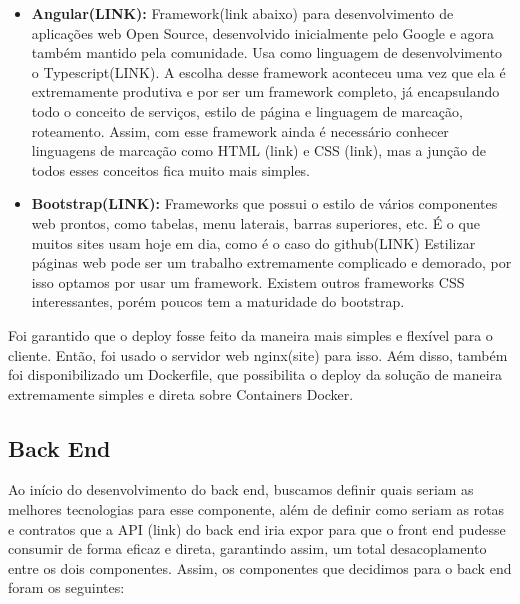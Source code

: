 \documentclass[11pt,twoside]{article}
\begin{document}
\begin{itemize}
  \item \textbf{Angular(LINK):} Framework(link abaixo) para desenvolvimento de aplicações web Open Source, desenvolvido inicialmente pelo Google e agora também mantido pela comunidade. Usa como linguagem de desenvolvimento o
  Typescript(LINK). A escolha desse framework aconteceu uma vez que ela é extremamente produtiva e por ser um framework completo, já encapsulando todo o conceito de serviços, estilo de página e 
  linguagem de marcação, roteamento. Assim, com esse framework ainda é necessário conhecer linguagens de marcação como HTML (link) e CSS (link), mas a junção de todos esses conceitos fica muito mais simples.
  \item \textbf{Bootstrap(LINK):} Frameworks que possui o estilo de vários componentes web prontos, como tabelas, menu laterais, barras superiores, etc. É o que muitos sites usam hoje em dia, como é o caso do github(LINK)
  Estilizar páginas web pode ser um trabalho extremamente complicado e demorado, por isso optamos por usar um framework. Existem outros frameworks CSS interessantes, porém poucos tem a maturidade do bootstrap.
\end{itemize}

Foi garantido que o deploy fosse feito da maneira mais simples e flexível para o cliente. Então, foi usado o servidor web nginx(site) para isso. Aém disso, também foi disponibilizado um Dockerfile, que possibilita
o deploy da solução de maneira extremamente simples e direta sobre Containers Docker.

\subsection{Back End}

Ao início do desenvolvimento do back end, buscamos definir quais seriam as melhores tecnologias para esse componente, além de definir como seriam as rotas e contratos que a API (link) do back end iria expor
para que o front end pudesse consumir de forma eficaz e direta, garantindo assim, um total desacoplamento entre os dois componentes. Assim, os componentes que decidimos para o back end foram os seguintes:
\end{document}
